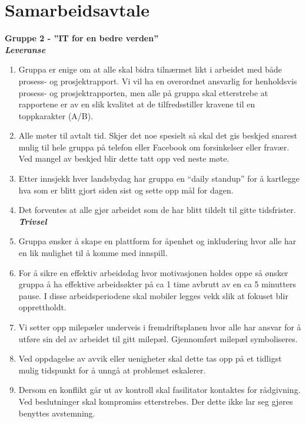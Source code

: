 \section{Samarbeidsavtale}
\label{appendix:samarbeidsavtale}
\bf{Gruppe 2 - ''IT for en bedre verden''}\\

\bf{\textit{Leveranse}}
\begin{enumerate}
\item Gruppa er enige om at alle skal bidra tilnærmet likt i arbeidet med både prosess- og prosjektrapport. Vi vil ha en overordnet ansvarlig for henholdsvis prosess- og prosjektrapporten, men alle på gruppa skal etterstrebe at rapportene er av en slik kvalitet at de tilfredsstiller kravene til en toppkarakter (A/B).
\item Alle møter til avtalt tid. Skjer det noe spesielt så skal det gis beskjed snarest mulig til hele gruppa på telefon eller Facebook om forsinkelser eller fravær. Ved mangel av beskjed blir dette tatt opp ved neste møte.
\item Etter innsjekk hver landsbydag har gruppa en “daily standup” for å kartlegge hva som er blitt gjort siden sist og sette opp mål for dagen.
\item Det forventes at alle gjør arbeidet som de har blitt tildelt til gitte tidsfrister.\\


\bf{\textit{Trivsel}}

\item Gruppa ønsker å skape en plattform for åpenhet og inkludering hvor alle har en lik mulighet til å komme med innspill.
\item For å sikre en effektiv arbeidsdag hvor motivasjonen holdes oppe så ønsker gruppa å ha effektive arbeidsøkter på ca 1 time avbrutt av en ca 5 minutters pause. I disse arbeidsperiodene skal mobiler legges vekk slik at fokuset blir opprettholdt.
\item Vi setter opp milepæler underveis i fremdriftsplanen hvor alle har ansvar for å utføre sin del av arbeidet til gitt milepæl. Gjennomført milepæl symboliseres.
\item Ved oppdagelse av avvik eller uenigheter skal dette tas opp på et tidligst mulig tidspunkt for å unngå at problemet eskalerer.
\item Dersom en konflikt går ut av kontroll skal fasilitator kontaktes for rådgivning.
Ved beslutninger skal kompromiss etterstrebes. Der dette ikke lar seg gjøres benyttes avstemning.\\


\end{enumerate}
